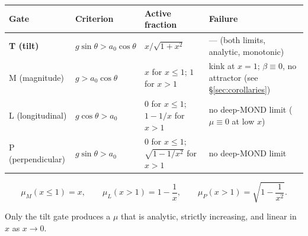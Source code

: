 \documentclass[11pt]{article}
\theoremstyle{plain}
\begin{document}
\begin{center}
\begin{tabular}{@{}l l l p{4.1cm}@{}}
\toprule
Gate & Criterion & Active fraction & Failure \\
\midrule
\textbf{T (tilt)} & $g\sin\theta > a_0\cos\theta$ & $x/\sqrt{1+x^2}$ & --- (both limits, analytic, monotonic) \\[4pt]
M (magnitude) & $g > a_0\cos\theta$ & $x$ for $x\leq 1$; $1$ for $x>1$ & kink at $x=1$; $\beta\equiv 0$, no attractor (see \S\ref{sec:corollaries}) \\[4pt]
L (longitudinal) & $g\cos\theta > a_0$ & $0$ for $x\leq 1$; $1-1/x$ for $x>1$ & no deep-MOND limit ($\mu\equiv0$ at low $x$) \\[4pt]
P (perpendicular) & $g\sin\theta > a_0$ & $0$ for $x\leq 1$; $\sqrt{1-1/x^2}$ for $x>1$ & no deep-MOND limit \\
\bottomrule
\end{tabular}
\end{center}

\begin{equation*}\tag{6}\label{eq:6}
\mu_M(x\leq1) = x, \qquad \mu_L(x>1) = 1-\frac1x, \qquad \mu_P(x>1) = \sqrt{1-\frac{1}{x^2}}.
\end{equation*}

Only the tilt gate produces a $\mu$ that is analytic, strictly increasing, and linear in $x$ as $x\to 0$.
\end{document}
